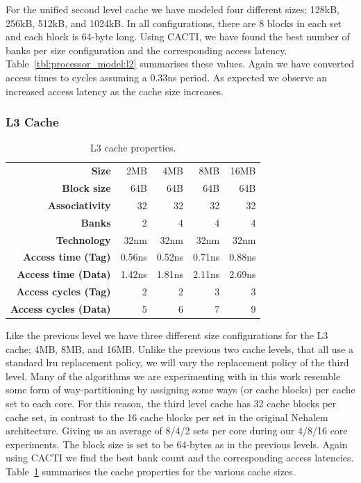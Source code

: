 For the unified second level cache we have modeled four different sizes; 128kB, 256kB, 512kB, and 1024kB. 
In all configurations, there are 8 blocks in each set and each block is 64-byte long.
Using CACTI, we have found the best number of banks per size configuration and the corresponding access latency.
Table~\ref{tbl:processor_model:l2} summarises these values. 
Again we have converted access times to cycles assuming a 0.33ns period.
As expected we observe an increased access latency as the cache size increases.

\subsubsection{L3 Cache}
\begin{table}[ht]
\centering
\begin{tabular}{rrrrr}
\toprule
\bf{Size}                 & 2MB         & 4MB         & 8MB         & 16MB       \\
\bf{Block size}           & 64B         & 64B         & 64B         & 64B         \\
\bf{Associativity}        & 32          & 32          & 32          & 32             \\
\bf{Banks}                & 2           & 4           & 4           & 4           \\
\bf{Technology}           & 32nm        & 32nm        & 32nm        & 32nm    \\
\bf{Access time (Tag)}    & 0.56ns      & 0.52ns      & 0.71ns      & 0.88ns   \\
\bf{Access time (Data)}   & 1.42ns      & 1.81ns      & 2.11ns      & 2.69ns     \\
\bf{Access cycles (Tag)}  & 2           & 2           & 3           & 3             \\
\bf{Access cycles (Data)} & 5           & 6           & 7           & 9      \\
\bottomrule
\end{tabular}
\caption{L3 cache properties.}
\label{tbl:processor_model:l3}
\end{table}

Like the previous level we have three different size configurations for the L3 cache; 4MB, 8MB, and 16MB.
Unlike the previous two cache levels, that all use a standard \gls{lru} replacement policy, we will vary the replacement policy of the third level.
Many of the algorithms we are experimenting with in this work resemble some form of way-partitioning by assigning some ways (or cache blocks) per cache set to each core.
For this reason, the third level cache has 32 cache blocks per cache set, in contrast to the 16 cache blocks per set in the original Nehalem architecture.
Giving us an average of 8/4/2 sets per core during our 4/8/16 core experiments.
The block size is set to be 64-bytes as in the previous levels.
Again using CACTI we find the best bank count and the corresponding access latencies.
Table~\ref{tbl:processor_model:l3} summarises the cache properties for the various cache sizes.